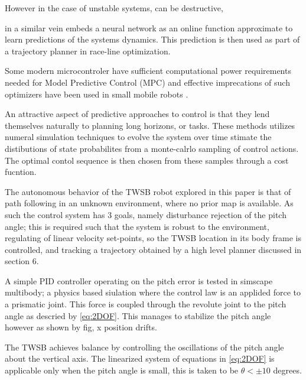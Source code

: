         However in the case of unstable systems, can be destructive,


        
            
        \cite{williams2016aggressive} in a similar vein embeds
        a neural network as an online function approximate to learn predictions of the systems dynamics. 
        This prediction is then used as part of a trajectory planner in race-line optimization. 

        Some modern microcontroler have sufficient computational power requirements needed for Model Predictive Control (MPC) and 
        effective imprecations of such optimizers have been used in small mobile robots \cite{nguyen2024tinympc}. 

        An attractive aspect of predictive approaches to control is that they lend themselves naturally to 
        planning long horizons, or tasks. These methods utilizes numeral simulation techniques to evolve the system 
        over time stimate the distibutions of state probabilites from a monte-calrlo sampling of control actions. The optimal
        contol sequence is then chosen from these samples through a cost fucntion. 
        

        
        The autonomous behavior of the TWSB 
        robot explored in this paper is that of path following in an unknown environment, where no prior 
        map is available. As such the control system has 3 goals, namely disturbance rejection of the
        pitch angle; this is required such that the system is robust to the environment, 
        regulating of linear velocity set-points, so the TWSB location in its body frame is controlled, 
        and tracking a trajectory obtained by a high level planner discussed in section 6. 

        A simple PID controller operating on the pitch error is tested in simscape multibody; 
        a physics based siulation where the control law 
        is an applided force to a prismatic joint. This force is coupled through the revolute 
        joint to the pitch angle as descried by \ref{eq:2DOF}.
        This manages to stabilize the pitch angle however as shown by fig, x position drifts.

        The TWSB achieves balance by controlling the oscillations of the pitch angle about the 
        vertical axis. The linearized system of equations in \ref{eq:2DOF} is applicable 
        only when the pitch angle is small, this is taken to be $\theta < ±10$ degrees. 
 
